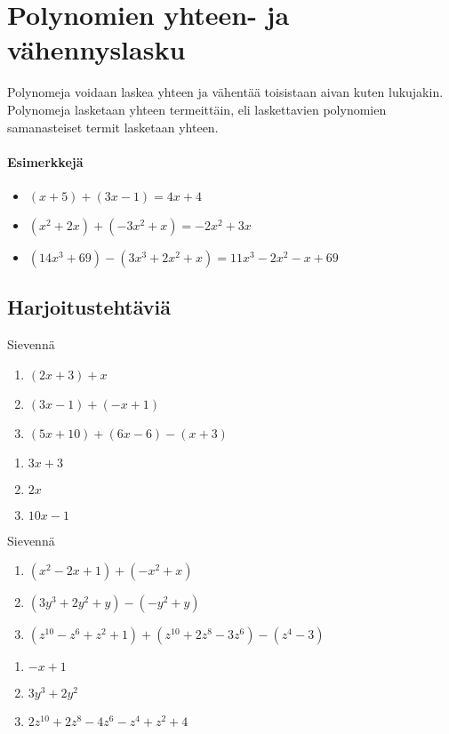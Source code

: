 \chapter{Polynomien yhteen- ja vähennyslasku}

Polynomeja voidaan laskea yhteen ja vähentää toisistaan aivan kuten lukujakin. Polynomeja lasketaan yhteen termeittäin, eli laskettavien polynomien samanasteiset termit lasketaan yhteen.

\subsubsection*{Esimerkkejä}
\begin{itemize}
    \item $(x+5) + (3x-1) = 4x + 4$
    \item $(x^2 + 2x) + (-3x^2 + x) = -2x^2 + 3x$
    \item $(14x^3 + 69) - (3x^3 + 2x^2 + x) = 11x^3 - 2x^2 - x +69$
\end{itemize}

\section{Harjoitustehtäviä}

\begin{tehtava}
    Sievennä
    \begin{enumerate}
        \item $(2x + 3) + x $
        \item $(3x - 1) + (-x + 1)$
        \item $(5x + 10) + (6x - 6) - (x + 3)$
    \end{enumerate}
    \begin{vastaus}
        \begin{enumerate}
            \item $3x + 3$
            \item $2x$
            \item $10x - 1$
        \end{enumerate}
    \end{vastaus}
\end{tehtava}

\begin{tehtava}
    Sievennä
    \begin{enumerate}
        \item $(x^2 - 2x + 1) + (-x^2 + x) $
        \item $(3y^3 + 2y^2  + y) - (-y^2 + y)$
        \item $(z^{10} - z^6 + z^2 + 1) + (z^{10} + 2z^8 - 3z^6) - (z^4 - 3)$
    \end{enumerate}
    \begin{vastaus}
        \begin{enumerate}
            \item $-x + 1$
            \item $3y^3 + 2y^2$
            \item $2z^{10} + 2z^8 - 4z^6 - z^4 + z^2 + 4$
        \end{enumerate}
    \end{vastaus}
\end{tehtava}

